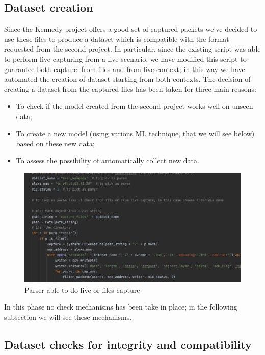 \documentclass[sigconf]{acmart}
\begin{document}
\subsection{Dataset creation}
Since the Kennedy project offers a good set of captured packets we've decided to use these files to produce a dataset which is compatible with the format requested from the second project. In particular, since the existing script was able to perform live capturing from a live scenario, we have modified this script to guarantee both capture: from files and from live context; in this way we have automated the creation of dataset starting from both contexts.
The decision of creating a dataset from the captured files has been taken for three main reasons:
\begin{itemize}
\item To check if the model created from the second project works well on unseen data;
\item To create a new model (using various ML technique, that we will see below) based on these new data;
\item To assess the possibility of automatically collect new data.
\end{itemize}
\begin{figure}[h!]
        \includegraphics[width=0.8\linewidth]{img/parser.png}
        \caption{Parser able to do live or files capture}
        \label{fig:parser}
    \end{figure}
In this phase no check mechanisms has been take in place; in the following subsection we will see these mechanisms.
\subsection{Dataset checks for integrity and compatibility}
\end{document}
